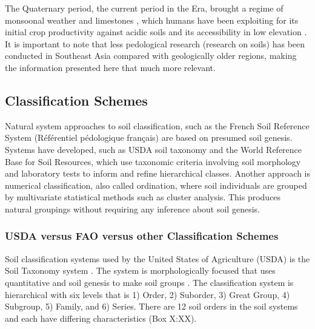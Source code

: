 The Quaternary period, the current period in the Era, brought a regime of monsoonal weather and limestones \citep{verstappen1997effect}, which humans have been exploiting for its initial crop productivity against acidic soils and its accessibility in low elevation \citep{asio2006morphology}. It is important to note that less pedological research (research on soils) has been conducted in Southeast Asia compared with geologically older regions, making the information presented here that much more relevant.
 
\subsection {Classification Schemes}

Natural system approaches to soil classification, such as the French Soil Reference System (Référentiel pédologique français) are based on presumed soil genesis. Systems have developed, such as USDA soil taxonomy and the World Reference Base for Soil Resources, which use taxonomic criteria involving soil morphology and laboratory tests to inform and refine hierarchical classes. Another approach is numerical classification, also called ordination, where soil individuals are grouped by multivariate statistical methods such as cluster analysis. This produces natural groupings without requiring any inference about soil genesis.

\subsubsection{USDA versus FAO versus other Classification Schemes}

Soil classification systems used by the United States of Agriculture (USDA) is the  Soil Taxonomy system \citep{soil2003keys}. The system is morphologically focused that uses quantitative and soil genesis to make soil groups \citep{buol1999oxisols}. The classification system is hierarchical with six levels that is 1) Order, 2) Suborder, 3) Great Group, 4) Subgroup, 5) Family, and 6) Series. There are 12 soil orders in the soil systems and each have differing characteristics (Box X:XX).

